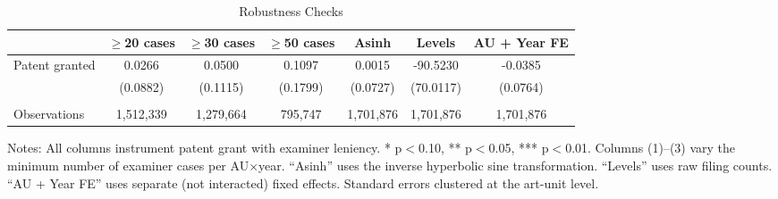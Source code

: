 \begin{table}[H]
\centering
\caption{Robustness Checks}
\begin{threeparttable}
\small
\begin{adjustbox}{max width=\textwidth}
\begin{tabular}{lcccccc}
\toprule
 & $\geq$20 cases & $\geq$30 cases & $\geq$50 cases & Asinh & Levels & AU + Year FE \\
\midrule
Patent granted & 0.0266 & 0.0500 & 0.1097 & 0.0015 & -90.5230 & -0.0385 \\
 & (0.0882) & (0.1115) & (0.1799) & (0.0727) & (70.0117) & (0.0764) \\
 & \\
Observations & 1,512,339 & 1,279,664 & 795,747 & 1,701,876 & 1,701,876 & 1,701,876 \\
\bottomrule
\end{tabular}
\end{adjustbox}
\begin{tablenotes}[flushleft]
\footnotesize
\item Notes: All columns instrument patent grant with examiner leniency. * p$<$0.10, ** p$<$0.05, *** p$<$0.01. Columns (1)--(3) vary the minimum number of examiner cases per AU$\times$year. ``Asinh'' uses the inverse hyperbolic sine transformation. ``Levels'' uses raw filing counts. ``AU + Year FE'' uses separate (not interacted) fixed effects. Standard errors clustered at the art-unit level.
\end{tablenotes}
\end{threeparttable}
\label{tab:robustness}
\end{table}

